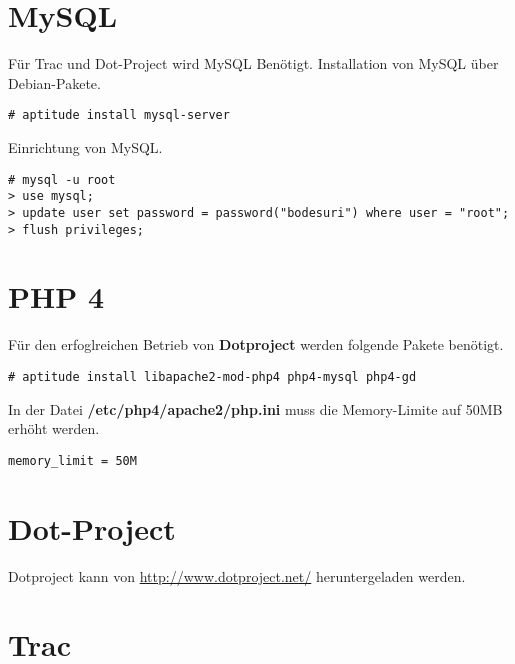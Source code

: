 \documentclass[a4paper,12pt,halfparskip,DIV14]{scrreprt}
\begin{document}

\section{MySQL} %
\label{sec:mysql}

Für Trac und Dot-Project wird MySQL Benötigt. Installation von MySQL über Debian-Pakete.

\begin{verbatim}
# aptitude install mysql-server
\end{verbatim}

Einrichtung von MySQL.

\begin{verbatim}
# mysql -u root
> use mysql;
> update user set password = password("bodesuri") where user = "root";
> flush privileges;
\end{verbatim}


\section{PHP 4} %
\label{sec:php_4}

Für den erfoglreichen Betrieb von \textbf{Dotproject} werden folgende Pakete benötigt.

\begin{verbatim}
# aptitude install libapache2-mod-php4 php4-mysql php4-gd
\end{verbatim}


In der Datei \textbf{/etc/php4/apache2/php.ini} muss die Memory-Limite auf 50MB erhöht werden.

\begin{verbatim}
memory_limit = 50M  
\end{verbatim}


\section{Dot-Project} %
\label{sec:dot_project}

Dotproject kann von \url{http://www.dotproject.net/} heruntergeladen werden.



\section{Trac}
\end{document}
